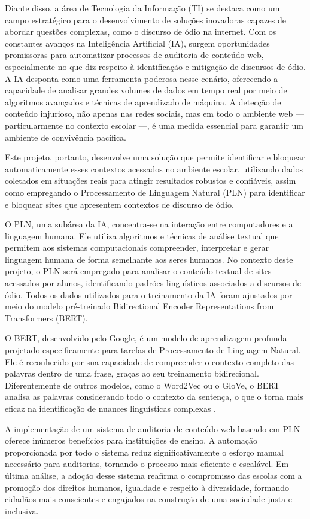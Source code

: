 Diante disso, a área de Tecnologia da Informação (TI) se destaca como um campo estratégico para o desenvolvimento de soluções inovadoras capazes de abordar questões complexas, como o discurso de ódio na internet. Com os constantes avanços na Inteligência Artificial (IA), surgem oportunidades promissoras para automatizar processos de auditoria de conteúdo web, especialmente no que diz respeito à identificação e mitigação de discursos de ódio. A IA desponta como uma ferramenta poderosa nesse cenário, oferecendo a capacidade de analisar grandes volumes de dados em tempo real por meio de algoritmos avançados e técnicas de aprendizado de máquina. A detecção de conteúdo injurioso, não apenas nas redes sociais, mas em todo o ambiente web — particularmente no contexto escolar —, é uma medida essencial para garantir um ambiente de convivência pacífica. 

Este projeto, portanto, desenvolve uma solução que permite identificar e bloquear automaticamente esses contextos acessados no ambiente escolar, utilizando dados coletados em situações reais para atingir resultados robustos e confiáveis, assim como empregando o Processamento de Linguagem Natural (PLN) para identificar e bloquear sites que apresentem contextos de discurso de ódio. 

O PLN, uma subárea da IA, concentra-se na interação entre computadores e a linguagem humana. Ele utiliza algoritmos e técnicas de análise textual que permitem aos sistemas computacionais compreender, interpretar e gerar linguagem humana de forma semelhante aos seres humanos. No contexto deste projeto, o PLN será empregado para analisar o conteúdo textual de sites acessados por alunos, identificando padrões linguísticos associados a discursos de ódio. Todos os dados utilizados para o treinamento da IA foram ajustados por meio do modelo pré-treinado Bidirectional Encoder Representations from Transformers (BERT).  

O BERT, desenvolvido pelo Google, é um modelo de aprendizagem profunda projetado especificamente para tarefas de Processamento de Linguagem Natural. Ele é reconhecido por sua capacidade de compreender o contexto completo das palavras dentro de uma frase, graças ao seu treinamento bidirecional. Diferentemente de outros modelos, como o Word2Vec ou o GloVe, o BERT analisa as palavras considerando todo o contexto da sentença, o que o torna mais eficaz na identificação de nuances linguísticas complexas \cite{saleh2023detection}.

A implementação de um sistema de auditoria de conteúdo web baseado em PLN oferece inúmeros benefícios para instituições de ensino. A automação proporcionada por todo o sistema reduz significativamente o esforço manual necessário para auditorias, tornando o processo mais eficiente e escalável. Em última análise, a adoção desse sistema reafirma o compromisso das escolas com a promoção dos direitos humanos, igualdade e respeito à diversidade, formando cidadãos mais conscientes e engajados na construção de uma sociedade justa e inclusiva.